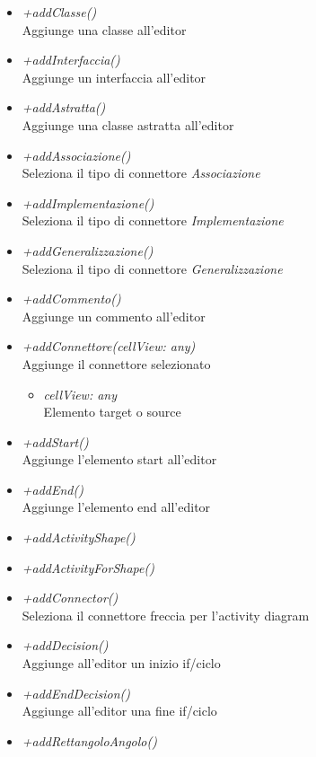\begin{itemize}
\begin{itemize}
\begin{itemize}
    		\end{itemize}
    		\item \emph{+addClasse()}\\
    		Aggiunge una classe all'editor
    		\item \emph{+addInterfaccia()}\\
    		Aggiunge un interfaccia all'editor
    		\item \emph{+addAstratta()}\\
    		Aggiunge una classe astratta all'editor
    		\item \emph{+addAssociazione()}\\
    		Seleziona il tipo di connettore \textit{Associazione}
    		\item \emph{+addImplementazione()}\\
    		Seleziona il tipo di connettore \textit{Implementazione}
    		\item \emph{+addGeneralizzazione()}\\
    		Seleziona il tipo di connettore \textit{Generalizzazione}
    		\item \emph{+addCommento()}\\
    		Aggiunge un commento all'editor
    		\item \emph{+addConnettore(cellView: any)}\\
    		Aggiunge il connettore selezionato
    			\begin{itemize}
    			\item \emph{cellView: any}\\
    			Elemento target o source
    		\end{itemize}
    		\item \emph{+addStart()}\\
    		Aggiunge l'elemento start all'editor
    		\item \emph{+addEnd()}\\
    		Aggiunge l'elemento end all'editor
    		\item \emph{+addActivityShape()}\\
    		
    		\item \emph{+addActivityForShape()}\\
    		
    		\item \emph{+addConnector()}\\
    		Seleziona il connettore freccia per l'activity diagram
    		\item \emph{+addDecision()}\\
    		Aggiunge all'editor un inizio if/ciclo
    		\item \emph{+addEndDecision()}\\
    		Aggiunge all'editor una fine if/ciclo
    		\item \emph{+addRettangoloAngolo()}\\
    		
		\end{itemize}
\end{itemize}
